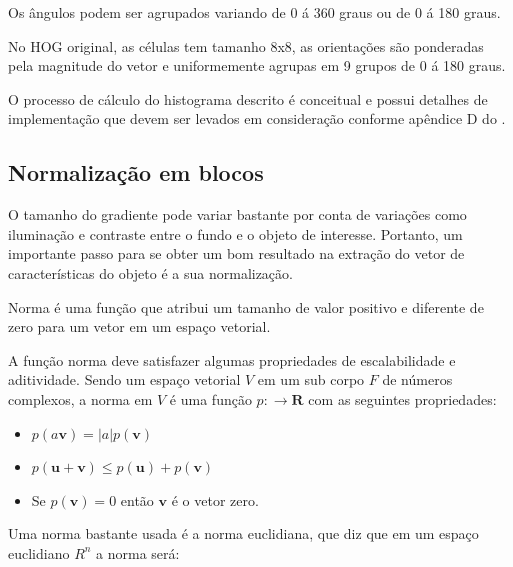 Os ângulos podem ser agrupados variando de 0 á 360 graus ou de 0 á 180 graus.

No HOG original, as células tem tamanho 8x8, as orientações são ponderadas pela magnitude do vetor e uniformemente agrupas em 9 grupos de 0 á 180 graus. \cite{dalal2005histograms}

O processo de cálculo do histograma descrito é conceitual e possui detalhes de implementação que devem ser levados em consideração conforme apêndice D do .

\subsection{Normalização em blocos}


O tamanho do gradiente pode variar bastante por conta de variações como iluminação e contraste entre o fundo e o objeto de interesse. Portanto, um importante passo para se obter um bom resultado na extração do vetor de características do objeto é a sua normalização.

Norma é uma função que atribui um tamanho de valor positivo e diferente de zero para um vetor em um espaço vetorial.

A função norma deve satisfazer algumas propriedades de escalabilidade e aditividade.
Sendo um espaço vetorial \(V\) em um sub corpo \(F\) de números complexos, a norma em \(V\) é uma função \(p:\rightarrow \mathbf{R}\) com as seguintes propriedades:

\begin{itemize}
\item \( p(a\mathbf{v}) = |a|p(\mathbf{v}) \)
\item \( p(\mathbf{u + v}) \leq p(\mathbf{u}) + p(\mathbf{v}) \)
\item Se \( p(\mathbf{v}) = 0 \) então \(\mathbf{v}\) é o vetor zero.
\end{itemize}

Uma norma bastante usada é a norma euclidiana,  que diz que em um espaço euclidiano \(R^n\) a norma será:

